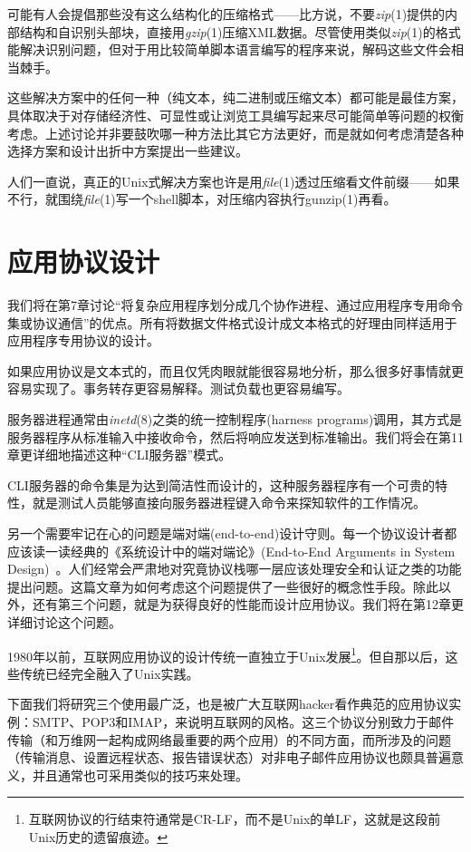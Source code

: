 \documentclass[12pt,oneside]{ctexbook}
\begin{document}
\begin{common-format}
可能有人会提倡那些没有这么结构化的压缩格式——比方说，不要\textit{zip}(1)提供的内部结构和自识别头部块，直接用\textit{gzip}(1)压缩XML数据。尽管使用类似\textit{zip}(1)的格式能解决识别问题，但对于用比较简单脚本语言编写的程序来说，解码这些文件会相当棘手。

这些解决方案中的任何一种（纯文本，纯二进制或压缩文本）都可能是最佳方案，具体取决于对存储经济性、可显性或让浏览工具编写起来尽可能简单等问题的权衡考虑。上述讨论并非要鼓吹哪一种方法比其它方法更好，而是就如何考虑清楚各种选择方案和设计出折中方案提出一些建议。

人们一直说，真正的Unix式解决方案也许是用\textit{file}(1)透过压缩看文件前缀——如果不行，就围绕\textit{file}(1)写一个shell脚本，对压缩内容执行gunzip(1)再看。


\section{应用协议设计}
我们将在第7章讨论“将复杂应用程序划分成几个协作进程、通过应用程序专用命令集或协议通信”的优点。所有将数据文件格式设计成文本格式的好理由同样适用于应用程序专用协议的设计。

如果应用协议是文本式的，而且仅凭肉眼就能很容易地分析，那么很多好事情就更容易实现了。事务转存更容易解释。测试负载也更容易编写。

服务器进程通常由\textit{inetd}(8)之类的统一控制程序(harness programs)调用，其方式是服务器程序从标准输入中接收命令，然后将响应发送到标准输出。我们将会在第11章更详细地描述这种“CLI服务器”模式。

CLI服务器的命令集是为达到简洁性而设计的，这种服务器程序有一个可贵的特性，就是测试人员能够直接向服务器进程键入命令来探知软件的工作情况。

另一个需要牢记在心的问题是端对端(end-to-end)设计守则。每一个协议设计者都应该读一读经典的《系统设计中的端对端论》(End-to-End Arguments in System Design)~\cite{Saltzer}。人们经常会严肃地对究竟协议栈哪一层应该处理安全和认证之类的功能提出问题。这篇文章为如何考虑这个问题提供了一些很好的概念性手段。除此以外，还有第三个问题，就是为获得良好的性能而设计应用协议。我们将在第12章更详细讨论这个问题。

1980年以前，互联网应用协议的设计传统一直独立于Unix发展\footnote{互联网协议的行结束符通常是CR-LF，而不是Unix的单LF，这就是这段前Unix历史的遗留痕迹。}。但自那以后，这些传统已经完全融入了Unix实践。

下面我们将研究三个使用最广泛，也是被广大互联网hacker看作典范的应用协议实例：SMTP、POP3和IMAP，来说明互联网的风格。这三个协议分别致力于邮件传输（和万维网一起构成网络最重要的两个应用）的不同方面，而所涉及的问题（传输消息、设置远程状态、报告错误状态）对非电子邮件应用协议也颇具普遍意义，并且通常也可采用类似的技巧来处理。




\end{common-format}
\end{document}
